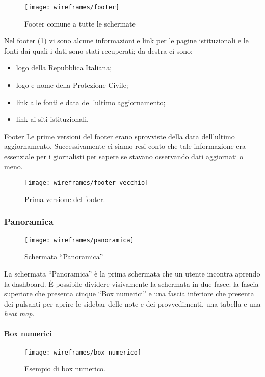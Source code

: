 \begin{figure}[H]
    \centering
    \texttt{[image: wireframes/footer]}
    \caption{Footer comune a tutte le schermate}\label{fig:footer}
\end{figure}

Nel footer (\ref{fig:footer}) vi sono alcune informazioni e link per le pagine istituzionali e le fonti dai quali i dati sono stati recuperati; da destra ci sono:
\begin{itemize}
    \item logo della Repubblica Italiana;
    \item logo e nome della Protezione Civile;
    \item link alle fonti e data dell'ultimo aggiornamento;
    \item link ai siti istituzionali.
\end{itemize}

\begin{bclogo}{Footer}
    Le prime versioni del footer erano sprovviste della data dell'ultimo aggiornamento. Successivamente ci siamo resi conto che tale informazione era essenziale per i giornalisti per sapere se stavano osservando dati aggiornati o meno.
\begin{figure}[H]
    \centering
    \texttt{[image: wireframes/footer-vecchio]}
    \caption{Prima versione del footer.}\label{fig:footer-vecchio}
\end{figure}
\end{bclogo}


\subsubsection{Panoramica}\label{ss:panoramica}
\begin{figure}[H]
    \centering
    \texttt{[image: wireframes/panoramica]}
    \caption{Schermata ``Panoramica''}\label{fig:panoramica}
\end{figure}
La schermata ``Panoramica'' è la prima schermata che un utente incontra aprendo la dashboard. \`E possibile dividere visivamente la schermata in due fasce: la fascia superiore che presenta cinque ``Box numerici'' e una fascia inferiore che presenta dei pulsanti per aprire le sidebar delle note e dei provvedimenti, una tabella e una \textit{heat map}.\\

\paragraph{Box numerici}
\begin{figure}[H]
    \centering
    \texttt{[image: wireframes/box-numerico]}
    \caption{Esempio di box numerico.}\label{fig:box-numerico}
\end{figure}

